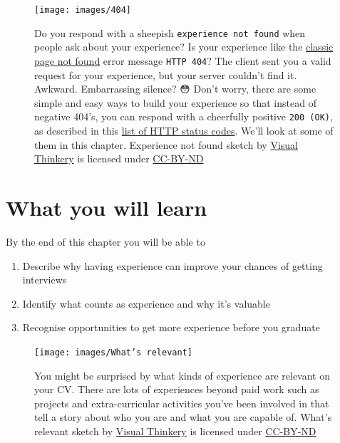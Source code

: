 \documentclass[
]{book}
\providecommand{\tightlist}{%
  \setlength{\itemsep}{0pt}\setlength{\parskip}{0pt}}
\begin{document}
\begin{figure}

{\centering \texttt{[image: images/404]} 

}

\caption{Do you respond with a sheepish \texttt{experience\ not\ found} when people ask about your experience? Is your experience like the \href{https://en.wikipedia.org/wiki/HTTP_404}{classic page not found} error message \texttt{HTTP\ 404}? The client sent you a valid request for your experience, but your server couldn't find it. Awkward. Embarrassing silence? 😳 Don't worry, there are some simple and easy ways to build your experience so that instead of negative 404's, you can respond with a cheerfully positive \texttt{200\ (OK)}, as described in this \href{https://en.wikipedia.org/wiki/List_of_HTTP_status_codes}{list of HTTP status codes}. We'll look at some of them in this chapter. Experience not found sketch by \href{https://visualthinkery.com/}{Visual Thinkery} is licensed under \href{https://creativecommons.org/licenses/by-nd/4.0/}{CC-BY-ND}}\label{fig:404-fig}
\end{figure}



\hypertarget{ilo5}{%
\section{What you will learn}\label{ilo5}}

By the end of this chapter you will be able to

\begin{enumerate}
\def\labelenumi{\arabic{enumi}.}
\tightlist
\item
  Describe why having experience can improve your chances of getting interviews
\item
  Identify what counts as experience and why it's valuable
\item
  Recognise opportunities to get more experience before you graduate
\end{enumerate}

\begin{figure}

{\centering \texttt{[image: images/What's relevant]} 

}

\caption{You might be surprised by what kinds of experience are relevant on your CV. There are lots of experiences beyond paid work such as projects and extra-curricular activities you've been involved in that tell a story about who you are and what you are capable of. What's relevant sketch by \href{https://visualthinkery.com/}{Visual Thinkery} is licensed under \href{https://creativecommons.org/licenses/by-nd/4.0/}{CC-BY-ND}}\label{fig:relevance-fig}
\end{figure}
\end{document}
